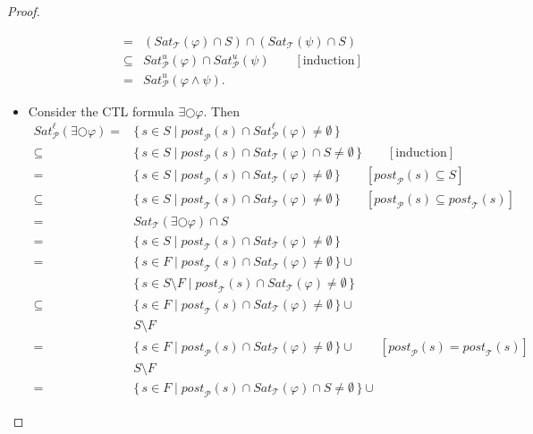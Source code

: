 \documentclass[12pt]{article}
\newcommand{\nxt}{\bigcirc}
\theoremstyle{definition}
\newcommand{\comment}[1]{\hspace{2em}[\mbox{#1}]}
\begin{document}
\begin{proof}
\begin{itemize}
\begin{align*}
= & (\mathit{Sat}_{\mathcal{T}}(\varphi) \cap S) \cap (\mathit{Sat}_{\mathcal{T}}(\psi) \cap S)\\
\subseteq & \mathit{Sat}^u_{\mathcal{P}}(\varphi) \cap \mathit{Sat}^u_{\mathcal{P}}(\psi)
\comment{induction}\\
= & \mathit{Sat}^u_{\mathcal{P}}(\varphi \wedge \psi).
\end{align*}
\item
Consider the CTL formula $\exists \nxt \varphi$.  Then
\begin{align*}
\mathit{Sat}^{\ell}_{\mathcal{P}}(\exists \nxt \varphi)
= & \{\, s \in S \mid \mathit{post}_{\mathcal{P}}(s) \cap \mathit{Sat}^{\ell}_{\mathcal{P}}(\varphi) \not= \emptyset \,\}\\
\subseteq & \{\, s \in S \mid \mathit{post}_{\mathcal{P}}(s) \cap \mathit{Sat}_{\mathcal{T}}(\varphi) \cap S \not= \emptyset \,\}
\comment{induction}\\
= & \{\, s \in S \mid \mathit{post}_{\mathcal{P}}(s) \cap \mathit{Sat}_{\mathcal{T}}(\varphi) \not= \emptyset \,\}
\comment{$\mathit{post}_{\mathcal{P}}(s) \subseteq S$}\\
\subseteq & \{\, s \in S \mid \mathit{post}_{\mathcal{T}}(s) \cap \mathit{Sat}_{\mathcal{T}}(\varphi) \not= \emptyset \,\}
\comment{$\mathit{post}_{\mathcal{P}}(s) \subseteq \mathit{post}_{\mathcal{T}}(s)$}\\
= & \mathit{Sat}_{\mathcal{T}}(\exists \nxt \varphi) \cap S\\
= & \{\, s \in S \mid \mathit{post}_{\mathcal{T}}(s) \cap \mathit{Sat}_{\mathcal{T}}(\varphi) \not= \emptyset \,\}\\
= & \{\, s \in F \mid \mathit{post}_{\mathcal{T}}(s) \cap \mathit{Sat}_{\mathcal{T}}(\varphi) \not= \emptyset \,\} \cup\\
& \{\, s \in S \setminus F \mid \mathit{post}_{\mathcal{T}}(s) \cap \mathit{Sat}_{\mathcal{T}}(\varphi) \not= \emptyset \,\}\\
\subseteq & \{\, s \in F \mid \mathit{post}_{\mathcal{T}}(s) \cap \mathit{Sat}_{\mathcal{T}}(\varphi) \not= \emptyset \,\} \cup\\
& S \setminus F\\
= & \{\, s \in F \mid \mathit{post}_{\mathcal{P}}(s) \cap \mathit{Sat}_{\mathcal{T}}(\varphi) \not= \emptyset \,\} \cup
\comment{$\mathit{post}_{\mathcal{P}}(s) = \mathit{post}_{\mathcal{T}}(s)$}\\
& S \setminus F\\
= & \{\, s \in F \mid \mathit{post}_{\mathcal{P}}(s) \cap \mathit{Sat}_{\mathcal{T}}(\varphi) \cap S \not= \emptyset \,\} \cup

\end{align*}
\end{itemize}
\end{proof}
\end{document}
